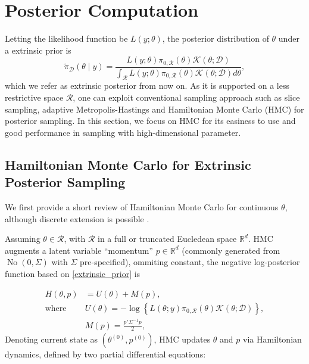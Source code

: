 \documentclass[10pt]{article}
\newcommand{\mc}[1]{\mathcal{#1}}
\DeclareMathOperator{\No}{No}
\DeclareMathOperator{\1}{\mathbbm{1}}
\begin{document}
\section{Posterior Computation}

Letting the likelihood function be $L(y;\theta)$, the posterior distribution of $\theta$ under a extrinsic prior is
\begin{equation}
\label{extrinsic_posterior}
	\tilde{\pi}_{\mc D}(\theta \mid y) = \frac{ L(y;\theta)\pi_{0,\mc R}(\theta) \mc{K}( \theta; \mc D) }{ \int_{\mc R} L(y;\theta)\pi_{0,\mc R}(\theta) \mc{K}(\theta; \mc D)d\theta },
\end{equation}
which we refer as extrinsic posterior from now on. As it is supported on a less restrictive space $\mc R$, one can exploit conventional sampling approach such as slice sampling, adaptive Metropolis-Hastings and Hamiltonian Monte Carlo (HMC) for posterior sampling. In this section, we focus on HMC for its easiness to use and good performance in sampling with high-dimensional parameter.

\subsection{Hamiltonian Monte Carlo for Extrinsic Posterior Sampling}

We first provide a short review of Hamiltonian Monte Carlo for continuous $\theta$, although discrete extension is possible \citep{zhang2012continuous,nishimura2017discontinuous}.

Assuming $\theta\in\mc R$, with $\mc R$ in a full or truncated Eucledean space $\mathbb R^d$. HMC augments a latent variable ``momentum'' $p\in \mathbb R^d$ (commonly generated from $\No(0, \Sigma)$ with $\Sigma$ pre-specified), ommiting constant, the negative log-posterior function based on \eqref{extrinsic_prior} is


\begin{equation}
\begin{aligned}
H(\theta, p)& = U(\theta)+M(p),\\
\text{where } & U(\theta) = -\log\left\{ L(\theta;y)\pi_{0,\mc R}(\theta) \mc{K}(\theta;\mc D) \right\},\\
& M(p) = \frac{p'\Sigma^{-1} p}{2},\end{aligned}
\end{equation}
Denoting current state as $(\theta^{(0)},p^{(0)})$, HMC updates $\theta$ and $p$ via Hamiltonian dynamics, defined by two partial differential equations:
\end{document}
